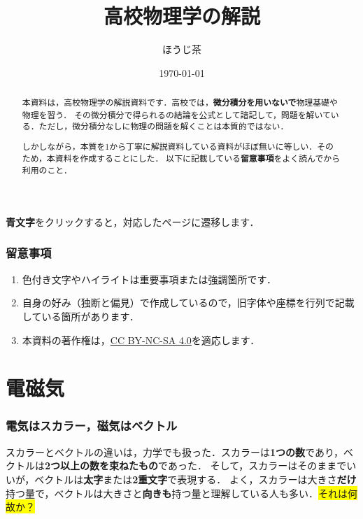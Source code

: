 \documentclass[a4paper,11pt]{ltjsarticle}
\title{高校物理学の解説}
\author{ほうじ茶}
\date{\today}
\begin{document}
\maketitle

\begin{abstract}
  本資料は，高校物理学の解説資料です．高校では，\textbf{微分積分を用いないで}物理基礎や物理を習う．
  その微分積分で得られるの結論を公式として諳記して，問題を解いている．ただし，微分積分なしに物理の問題を解くことは本質的ではない．
  
  しかしながら，本質を1から丁寧に解説資料している資料がほぼ無いに等しい．そのため，本資料を作成することにした．
  以下に記載している\textbf{留意事項}をよく読んでから利用のこと．
\end{abstract}

\tableofcontents

\vspace{12pt}

\begin{center}
  \textbf{\color{blue}青文字}をクリックすると，対応したページに遷移します．
\end{center}

\section*{留意事項}

\begin{enumerate}
  \item 色付き文字やハイライトは重要事項または強調箇所です．
  \item 自身の好み（独断と偏見）で作成しているので，旧字体や座標を行列で記載している箇所があります．
  \item 本資料の著作権は，\href{https://creativecommons.org/licenses/by-nc-sa/4.0}{CC BY-NC-SA 4.0}を適応します．
\end{enumerate}

\clearpage

\part{電磁気}

\section{電気はスカラー，磁気はベクトル}

スカラーとベクトルの違いは，力学でも扱った．スカラーは\textbf{1つの数}であり，ベクトルは\textbf{2つ以上の数を束ねたもの}であった．
そして，スカラーはそのままでいいが，ベクトルは\textbf{太字}または\textbf{2重文字}で表現する．
よく，スカラーは大きさ\textbf{だけ}持つ量で，ベクトルは大きさと\textbf{向きも}持つ量と理解している人も多い．\colorbox{yellow}{それは何故か？}
\end{document}
